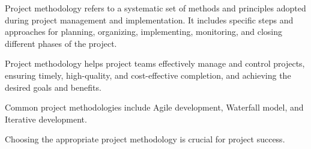 
Project methodology refers to a systematic set of methods 
and principles adopted during project management and implementation.
It includes specific steps and approaches 
for planning, organizing, implementing, monitoring, 
and closing different phases of the project.

Project methodology helps project teams effectively manage 
and control projects, ensuring timely, high-quality, 
and cost-effective completion, and achieving the desired goals and benefits. 

Common project methodologies 
include Agile development, Waterfall model, and Iterative development.

Choosing the appropriate project methodology is crucial for project success.
